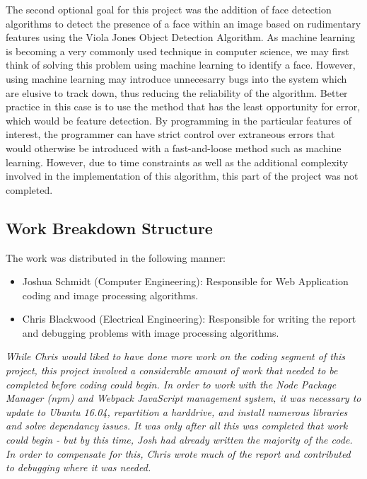\documentclass{article}
\let\Oldsubsection\subsection
\renewcommand{\subsection}{\FloatBarrier\Oldsubsection}
\begin{document}
  The second optional goal for this project was the addition of face detection algorithms to detect the presence of a face within an image based on rudimentary features using the Viola Jones Object Detection Algorithm. As machine learning is becoming a very commonly used technique in computer science, we may first think of solving this problem using machine learning to identify a face. However, using machine learning may introduce unnecesarry bugs into the system which are elusive to track down, thus reducing the reliability of the algorithm. Better practice in this case is to use the method that has the least opportunity for error, which would be feature detection. By programming in the particular features of interest, the programmer can have strict control over extraneous errors that would otherwise be introduced with a fast-and-loose method such as machine learning. However, due to time constraints as well as the additional complexity involved in the implementation of this algorithm, this part of the project was not completed.
  
  \subsection{Work Breakdown Structure}
  
  The work was distributed in the following manner:
  \begin{itemize}
  \item Joshua Schmidt (Computer Engineering): Responsible for Web Application coding and image processing algorithms.
  \item Chris Blackwood (Electrical Engineering): Responsible for writing the report and debugging problems with image processing algorithms.
  \end{itemize}
  
  \textit {
  While Chris would liked to have done more work on the coding segment of this project, this project involved a considerable amount of work that needed to be completed before coding could begin. In order to work with the Node Package Manager (npm) and Webpack JavaScript management system, it was necessary to update to Ubuntu 16.04, repartition a harddrive, and install numerous libraries and solve dependancy issues. It was only after all this was completed that work could begin - but by this time, Josh had already written the majority of the code. In order to compensate for this, Chris wrote much of the report and contributed to debugging where it was needed.}
  
\end{document}
